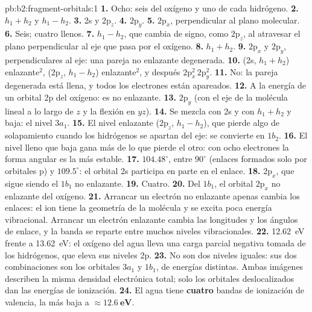 \begin{solution}{pb:b2:fragment-orbitals:1}
\textbf{1.} Ocho: seis del oxígeno y uno de cada hidrógeno.
\textbf{2.} $h_1 + h_2$ y $h_1 - h_2$.
\textbf{3.} 2s y $2\mathrm p_z$.
\textbf{4.} $2\mathrm p_y$.
\textbf{5.} $2\mathrm p_x$, perpendicular al plano molecular.
\textbf{6.} Seis; cuatro llenos.
\textbf{7.} $h_1 - h_2$, que cambia de signo, como $2\mathrm p_z$, al atravesar el plano
perpendicular al eje que pasa por el oxígeno.
\textbf{8.} $h_1 + h_2$.
\textbf{9.} $2\mathrm p_x$ y $2\mathrm p_y$, perpendiculares al eje: una pareja no enlazante
degenerada.
\textbf{10.} (2s, $h_1 + h_2$) enlazante$^2$, ($2\mathrm p_z$, $h_1 - h_2$) enlazante$^2$, y después
$2\mathrm p_x^2\,2\mathrm p_y^2$.
\textbf{11.} No: la pareja degenerada está llena, y todos los electrones están apareados.
\textbf{12.} A la energía de un orbital 2p del oxígeno: es no enlazante.
\textbf{13.} $2\mathrm p_y$ (con el eje de la molécula lineal a lo largo de $z$ y la flexión en $yz$).
\textbf{14.} Se mezcla con 2s y con $h_1 + h_2$ y baja: el nivel $3a_1$.
\textbf{15.} El nivel enlazante ($2\mathrm p_z$, $h_1 - h_2$), que pierde algo de solapamiento cuando los
hidrógenos se apartan del eje: se convierte en $1b_2$.
\textbf{16.} El nivel lleno que baja gana más de lo que pierde el otro: con ocho
electrones la forma angular es la más estable.
\textbf{17.} $104.48^\circ$, entre $90^\circ$ (enlaces formados solo por orbitales p) y $109.5^\circ$:
el orbital 2s participa en parte en el enlace.
\textbf{18.} $2\mathrm p_x$, que sigue siendo el $1b_1$ no enlazante.
\textbf{19.} Cuatro.
\textbf{20.} Del $1b_1$, el orbital $2\mathrm p_x$ no enlazante del oxígeno.
\textbf{21.} Arrancar un electrón no enlazante apenas cambia los enlaces: el ion tiene la
geometría de la molécula y se excita poca energía vibracional. Arrancar un electrón
enlazante cambia las longitudes y los ángulos de enlace, y la banda se reparte entre
muchos niveles vibracionales.
\textbf{22.} \qty{12.62}{eV} frente a \qty{13.62}{eV}: el oxígeno del agua lleva una carga parcial
negativa tomada de los hidrógenos, que eleva sus niveles 2p.
\textbf{23.} No son dos niveles iguales: sus dos combinaciones son los orbitales $3a_1$ y
$1b_1$, de energías distintas. Ambas imágenes describen la misma densidad electrónica
total; solo los orbitales deslocalizados dan las energías de ionización.
\textbf{24.} El agua tiene \textbf{cuatro} bandas de ionización de valencia, la más baja a
$\boldsymbol{\approx \qty{12.6}{eV}}$.
\end{solution}
